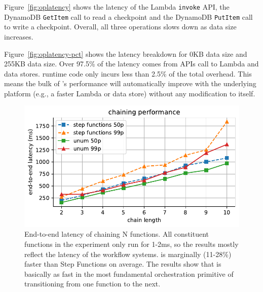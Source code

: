 Figure~\ref{fig:oplatency} shows the latency of the Lambda \texttt{invoke}
API, the DynamoDB \texttt{GetItem} call to read a checkpoint and the DynamoDB
\texttt{PutItem} call to write a checkpoint. Overall, all three operations
slows down as data size increases.

Figure~\ref{fig:oplatency-pct} shows the latency breakdown for 0KB data size
and 255KB data size. Over 97.5\% of the latency comes from APIs call to Lambda
and data stores. \name{} runtime code only incurs less than 2.5\% of the total
overhead. This means the bulk of \name{}'s performance will automatically
improve with the underlying platform (e.g., a faster Lambda or data store)
without any modification to \name{} itself.

\begin{figure}[t!]
    \centering
    \includegraphics[width=\columnwidth]{figures/ChainMicroLatency.pdf}
    \caption{End-to-end latency of chaining N functions. All constituent
    functions in the experiment only run for 1-2ms, so the results mostly
    reflect the latency of the workflow systems. \name{} is marginally
    (11-28\%) faster than Step Functions on average. The results show that
    \name{} is basically as fast in the most fundamental orchestration
    primitive of transitioning from one function to the next.}
    \label{fig:chainmicrolatency}
\end{figure}

